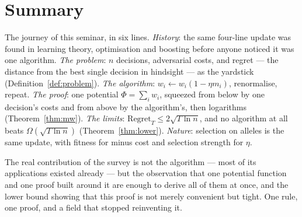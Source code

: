 \documentclass[11pt,a4paper]{article}
\theoremstyle{plain}
\theoremstyle{definition}
\newcommand{\regret}{\mathrm{Regret}}
\newcommand{\sq}[1]{\sqrt{#1}}
\begin{document}
\clearpage
\section{Summary}

The journey of this seminar, in six lines.
\emph{History}: the same four-line update was found in learning theory, optimisation and boosting before anyone noticed it was one algorithm.
\emph{The problem}: $n$ decisions, adversarial costs, and regret --- the distance from the best single decision in hindsight --- as the yardstick (Definition~\ref{def:problem}).
\emph{The algorithm}: $w_i \leftarrow w_i(1-\eta m_i)$, renormalise, repeat.
\emph{The proof}: one potential $\Phi = \sum_i w_i$, squeezed from below by one decision's costs and from above by the algorithm's, then logarithms (Theorem~\ref{thm:mw}).
\emph{The limits}: $\regret_T \le 2\sq{T\ln n}$, and no algorithm at all beats $\Omega(\sq{T\ln n})$ (Theorem~\ref{thm:lower}).
\emph{Nature}: selection on alleles is the same update, with fitness for minus cost and selection strength for $\eta$.

The real contribution of the survey is not the algorithm --- most of its applications existed already --- but the observation that one potential function and one proof built around it are enough to derive all of them at once, and the lower bound showing that this proof is not merely convenient but tight. One rule, one proof, and a field that stopped reinventing it.
\end{document}
